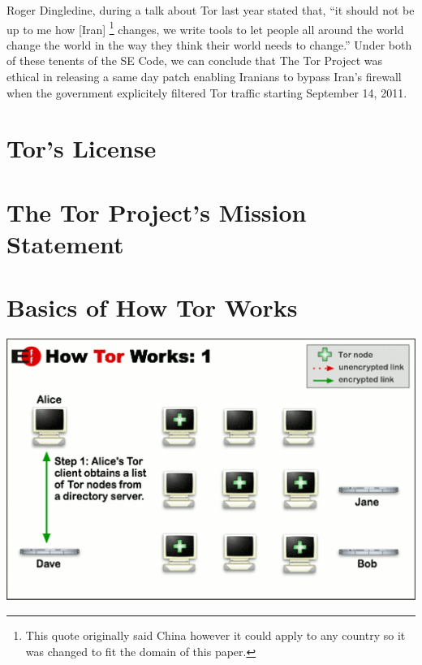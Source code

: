 \documentclass[11pt]{article}
\begin{document}
\begin{multicols}{2}
Roger Dingledine, during a talk about Tor last year stated that, ``it should not
be up to me how [Iran] \footnote{This quote originally said China however it could
  apply to any country so it was changed to fit the domain of this
paper.} changes, we write tools to let people all around the world change the
world in the way they think their world needs to change.'' \cite{Tor:28c3} Under
both of these tenents of the SE Code, we can conclude that The Tor Project was
ethical in releasing a same day patch enabling Iranians to bypass Iran's
firewall when the government explicitely filtered Tor traffic starting September
14, 2011.


\end{multicols} \newpage

\appendix

\section{Tor's License}
\label{Tor:License}


\section{The Tor Project's Mission Statement}
\label{Tor:MissionStatement}



\section{Basics of How Tor Works}
\label{Tor:HowTorWorks}

\begin{center}
\includegraphics[natwidth=510bp,natheight=326bp,width= 0.7\linewidth]{appendix/htw1.png}
\end{center}

\end{document}
